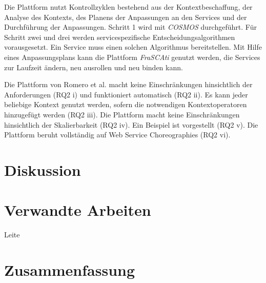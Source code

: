 \documentclass[conference,compsoc]{IEEEtran}
\begin{document}
Die Plattform nutzt Kontrollzyklen bestehend aus der Kontextbeschaffung, der Analyse des Kontexts, des Planens der Anpassungen an den Services und der Durchführung der Anpassungen. Schritt 1 wird mit \textit{COSMOS} durchgeführt. Für Schritt zwei und drei werden servicespezifische Entscheidungsalgorithmen vorausgesetzt. Ein Service muss einen solchen Algorithmus bereitstellen. Mit Hilfe eines Anpassungsplans kann die Plattform \textit{FraSCAti} genutzt werden, die Services zur Laufzeit ändern, neu ausrollen und neu binden kann.

Die Plattform von Romero et al. \cite{RRS10} macht keine Einschränkungen hinsichtlich der Anforderungen (RQ2 i) und funktioniert automatisch (RQ2 ii). Es kann jeder beliebige Kontext genutzt werden, sofern die notwendigen Kontextoperatoren hinzugefügt werden (RQ2 iii). Die Plattform macht keine Einschränkungen hinsichtlich der Skalierbarkeit (RQ2 iv). Ein Beispiel ist vorgestellt (RQ2 v). Die Plattform beruht vollständig auf Web Service Choreographies (RQ2 vi).


\section{Diskussion}

\section{Verwandte Arbeiten}

Leite \cite{leite2013systematic}\\


\section{Zusammenfassung}



%
%
\end{document}

